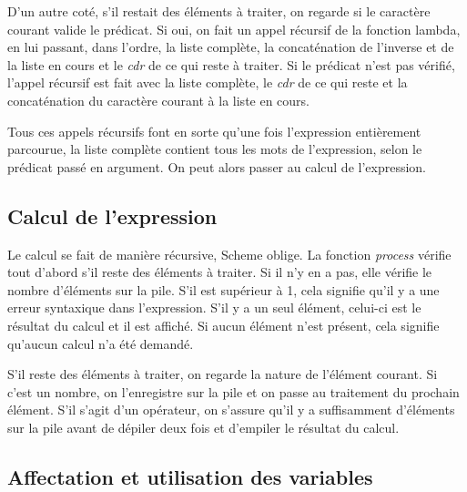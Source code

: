 \documentclass[letterpaper,12pt]{scrartcl}
\begin{document}
        \vspace{0.5cm}
        
        D'un autre coté, s'il restait des éléments à traiter, on regarde si le caractère courant valide le prédicat. Si oui, on fait un appel récursif de la fonction lambda, en lui passant, dans l'ordre, la liste complète, la concaténation de l'inverse et de la liste en cours et le \textit{cdr} de ce qui reste à traiter. Si le prédicat n'est pas vérifié, l'appel récursif est fait avec la liste complète, le \textit{cdr} de ce qui reste et la concaténation du caractère courant à la liste en cours.
        
        \vspace{0.5cm}
        
        Tous ces appels récursifs font en sorte qu'une fois l'expression entièrement parcourue, la liste complète contient tous les mots de l'expression, selon le prédicat passé en argument. On peut alors passer au calcul de l'expression.
        
        
        \subsection{Calcul de l'expression}
        
        Le calcul se fait de manière récursive, Scheme oblige. La fonction \textit{process} vérifie tout d'abord s'il reste des éléments à traiter. Si il n'y en a pas, elle vérifie le nombre d'éléments sur la pile. S'il est supérieur à 1, cela signifie qu'il y a une erreur syntaxique dans l'expression. S'il y a un seul élément, celui-ci est le résultat du calcul et il est affiché. Si aucun élément n'est présent, cela signifie qu'aucun calcul n'a été demandé.
        
		\vspace{0.5cm}
        
        S'il reste des éléments à traiter, on regarde la nature de l'élément courant. Si c'est un nombre, on l'enregistre sur la pile et on passe au traitement du prochain élément. S'il s'agit d'un opérateur, on s'assure qu'il y a suffisamment d'éléments sur la pile avant de dépiler deux fois et d'empiler le résultat du calcul.
        
        
        \subsection{Affectation et utilisation des variables}
        
\end{document}
